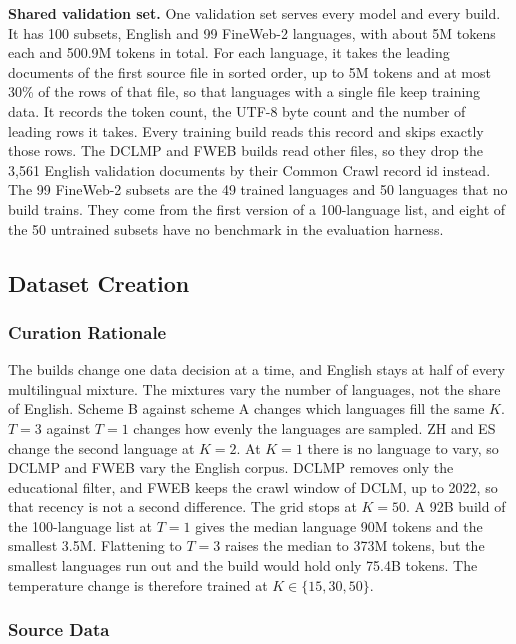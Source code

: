 \textbf{Shared validation set.} One validation set serves every model and every build. It has 100 subsets, English and 99 FineWeb-2 languages, with about 5M tokens each and 500.9M tokens in total. For each language, it takes the leading documents of the first source file in sorted order, up to 5M tokens and at most 30\% of the rows of that file, so that languages with a single file keep training data. It records the token count, the UTF-8 byte count and the number of leading rows it takes. Every training build reads this record and skips exactly those rows. The DCLMP and FWEB builds read other files, so they drop the 3,561 English validation documents by their Common Crawl record id instead. The 99 FineWeb-2 subsets are the 49 trained languages and 50 languages that no build trains. They come from the first version of a 100-language list, and eight of the 50 untrained subsets have no benchmark in the evaluation harness.

\subsection*{Dataset Creation}

\subsubsection*{Curation Rationale}

The builds change one data decision at a time, and English stays at half of every multilingual mixture. The mixtures vary the number of languages, not the share of English. Scheme B against scheme A changes which languages fill the same $K$. $T=3$ against $T=1$ changes how evenly the languages are sampled. ZH and ES change the second language at $K=2$. At $K=1$ there is no language to vary, so DCLMP and FWEB vary the English corpus. DCLMP removes only the educational filter, and FWEB keeps the crawl window of DCLM, up to 2022, so that recency is not a second difference. The grid stops at $K=50$. A 92B build of the 100-language list at $T=1$ gives the median language 90M tokens and the smallest 3.5M. Flattening to $T=3$ raises the median to 373M tokens, but the smallest languages run out and the build would hold only 75.4B tokens. The temperature change is therefore trained at $K \in \{15, 30, 50\}$.

\subsubsection*{Source Data}

